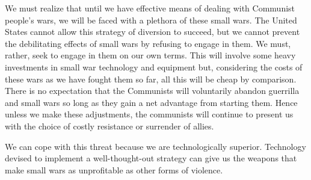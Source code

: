 We must realize that until we have effective means of dealing with Communist people's wars, we will be faced with a plethora of these small wars. The United States cannot allow this strategy of diversion to succeed, but we cannot prevent the debilitating effects of small wars by refusing to engage in them. We must, rather, seek to engage in them on our own terms. This will involve some heavy investments in small war technology and equipment but, considering the costs of these wars as we have fought them so far, all this will be cheap by comparison. There is no expectation that the Communists will voluntarily abandon guerrilla and small wars so long as they gain a net advantage from starting them. Hence unless we make these adjustments, the communists will continue to present us with the choice of costly resistance or surrender of allies.

We can cope with this threat because we are technologically superior. Technology devised to implement a well-thought-out strategy can give us the weapons that make small wars as unprofitable as other forms of violence.
